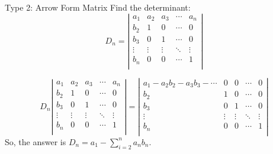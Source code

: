\documentclass{beamer}
\begin{document}
\begin{frame}{Type 2: Arrow Form Matrix}
Find the determinant:
\begin{equation*}
D_n=\left| \begin{matrix}
	a_1&		a_2&		a_3&		\cdots&		a_n\\
	b_2&		1&		0&		\cdots&		0\\
	b_3&		0&		1&		\cdots&		0\\
	\vdots&		\vdots&		\vdots&		\ddots&		\vdots\\
	b_n&		0&		0&		\cdots&		1\\
\end{matrix} \right|
\end{equation*}

\begin{equation*}
    D_n\left| \begin{matrix}
        a_1&		a_2&		a_3&		\cdots&		a_n\\
        b_2&		1&		0&		\cdots&		0\\
        b_3&		0&		1&		\cdots&		0\\
        \vdots&		\vdots&		\vdots&		\ddots&		\vdots\\
        b_n&		0&		0&		\cdots&		1\\
    \end{matrix} \right|=\left| \begin{matrix}
        a_1-a_2b_2-a_3b_3-\cdots&		0&		0&		\cdots&		0\\
        b_2&		1&		0&		\cdots&		0\\
        b_3&		0&		1&		\cdots&		0\\
        \vdots&		\vdots&		\vdots&		\ddots&		\vdots\\
        b_n&		0&		0&		\cdots&		1\\
    \end{matrix} \right|
\end{equation*}
So, the answer is $D_n=a_1-\sum_{i=2}^n{a_nb_n}$.
\end{frame}
\end{document}
